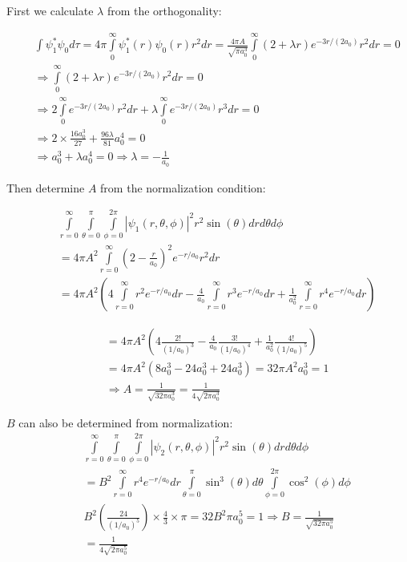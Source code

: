 \begin{enumerate}
First we calculate $\lambda$ from the orthogonality:

\begin{eqnarray}
\nonumber
& & \int\psi_1^*\psi_0 d\tau = 4\pi\int\limits_{0}^\infty\psi^*_1(r)\psi_0(r)r^2dr = \frac{4\pi A}{\sqrt{\pi a_0^3}}\int\limits_{0}^\infty (2 + \lambda r)e^{-3r/(2a_0)} r^2dr = 0\\
\nonumber
& & \Rightarrow \int\limits_{0}^\infty(2 + \lambda r)e^{-3r/(2a_0)}r^2dr = 0\\
\nonumber
& & \Rightarrow 2\int\limits_{0}^{\infty}e^{-3r/(2a_0)}r^2dr + \lambda\int\limits_{0}^{\infty}e^{-3r/(2a_0)}r^3dr = 0\\
\nonumber
& & \Rightarrow 2\times\frac{16a_0^3}{27} + \frac{96\lambda}{81}a_0^4 = 0\\
\nonumber
& & \Rightarrow a_0^3 + \lambda a_0^4 = 0 \Rightarrow \lambda = -\frac{1}{a_0}
\end{eqnarray}

Then determine $A$ from the normalization condition:

\begin{eqnarray}
\nonumber
& & \int\limits_{r=0}^{\infty}\int\limits_{\theta = 0}^{\pi}\int\limits_{\phi = 0}^{2\pi}\left|\psi_1(r,\theta,\phi)\right|^2 r^2 \sin(\theta) drd\theta d\phi\\
\nonumber
& & = 4\pi A^2\int\limits_{r=0}^{\infty}\left(2 - \frac{r}{a_0}\right)^2e^{-r/a_0}r^2dr\\
\nonumber
& & = 4\pi A^2\left(4\int\limits_{r=0}^{\infty} r^2e^{-r/a_0}dr - \frac{4}{a_0}\int\limits_{r=0}^{\infty} r^3e^{-r/a_0}dr + \frac{1}{a_0^2}\int\limits_{r=0}^{\infty} r^4 e^{-r/a_0}dr\right)
\end{eqnarray}

\begin{eqnarray}
\nonumber
& & = 4\pi A^2\left(4\frac{2!}{(1/a_0)^3} - \frac{4}{a_0}\frac{3!}{(1/a_0)^4} + \frac{1}{a_0^2}\frac{4!}{(1/a_0)^5}\right)\\
\nonumber
& & = 4\pi A^2\left(8a_0^3 - 24a_0^3 + 24a_0^3\right) = 32\pi A^2 a_0^3 = 1\\
\nonumber
& & \Rightarrow A = \frac{1}{\sqrt{32\pi a_0^3}} = \frac{1}{4\sqrt{2\pi a_0^3}}
\end{eqnarray}

$B$ can also be determined from normalization:
\begin{eqnarray}
\nonumber
& & \int\limits_{r=0}^{\infty}\int\limits_{\theta = 0}^{\pi}\int\limits_{\phi = 0}^{2\pi}\left|\psi_2(r,\theta,\phi)\right|^2 r^2 \sin(\theta) drd\theta d\phi\\
\nonumber
& & = B^2\int\limits_{r = 0}^{\infty}r^4e^{-r/a_0}dr\int\limits_{\theta = 0}^{\pi}\sin^3(\theta)d\theta\int\limits_{\phi = 0}^{2\pi}\cos^2(\phi)d\phi\\
\nonumber
& & B^2\left(\frac{24}{(1/a_0)^5}\right)\times\frac{4}{3}\times\pi = 32B^2\pi a_0^5 = 1 \Rightarrow B = \frac{1}{\sqrt{32\pi a_0^5}}\\
\nonumber
& & = \frac{1}{4\sqrt{2\pi a_0^5}}
\end{eqnarray}


\end{enumerate}
